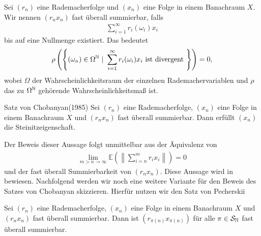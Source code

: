 \begin{df}
Sei $ (r_n) $ eine Rademacherfolge und $ (x_n) $ eine Folge in einem Banachraum $ X $. 
Wir nennen $ (r_n x_n) $ fast überall summierbar, falls 
\begin{align*}
	\sum 
	\limits_{i = 1}^\infty r_i(\omega_i) x_i
\end{align*}
bis auf eine Nullmenge existiert.
Das bedeutet
\begin{align*}
	\rho
	\left(
	\left\{
	(\omega_n) \in \Omega^{\mathbb{N}} \ | \ \sum \limits_{i = 1}^\infty r_i(\omega_i) x_i\ \textrm{ist divergent} \
	\right\}
	\right) = 0,
\end{align*}
wobei $ \Omega  $ der Wahrscheinlichkeitsraum der einzelnen Rademachervariablen und $ \rho $ das zu $ \Omega^{\mathbb{N}} $ gehörende Wahrscheinlichkeitsmaß ist.
\end{df}

\newpage
\begin{genericthm}{Satz von Chobanyan(1985)}\label{th:lemma_of_chobanyan}
	Sei $ (r_n) $ eine Rademacherfolge, $ (x_n) $ eine Folge in einem Banachraum $ X $
	und $ (r_n x_n) $ fast überall summierbar.
	Dann erfüllt $ (x_n) $ die Steinitzeigenschaft.
\end{genericthm}

Der Beweis dieser Aussage folgt unmittelbar aus der Äquivalenz von 
\begin{align*}
	\lim \limits_{m > n \to \infty} \mathbb{E}
	\left(
	\left\|
	\sum \limits_{i=n}^m
	r_i x_i
	\right\|
	\right) = 0
\end{align*}
und der fast überall Summierbarkeit von $ (r_n x_n) $.
Diese Aussage wird in \cite[Chapter 5, \S 5]{Vakhania:1987}  bewiesen. Nachfolgend werden wir noch eine weitere Variante für den Beweis des Satzes von Chobanyan skizzieren.
Hierfür nutzen wir den Satz von Pecherskii
\begin{lem}
	Sei $ (r_n) $ eine Rademacherfolge, $ (x_n) $ eine Folge in einem Banachraum $ X $ und $ (r_n x_n ) $ fast überall summierbar.
	Dann ist $ (r_{\pi(n)} x_{\pi(n) } ) $ für alle $ \pi \in \mathcal{S}_{\mathbb{N}} $ fast überall summierbar.
\end{lem}

